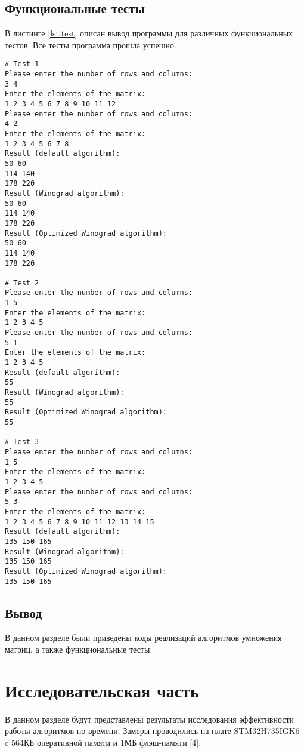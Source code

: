 \documentclass{bmstu}
\begin{document}
\section{Функциональные тесты}
В листинге \ref{lst:test} описан вывод программы для различных функциональных тестов. Все тесты программа прошла успешно.
\begin{center}
\captionsetup{justification=raggedright,singlelinecheck=off}
\begin{lstlisting}[label=lst:test, numbers=none, caption=Функциональные тесты]
# Test 1
Please enter the number of rows and columns:
3 4
Enter the elements of the matrix:
1 2 3 4 5 6 7 8 9 10 11 12
Please enter the number of rows and columns:
4 2
Enter the elements of the matrix:
1 2 3 4 5 6 7 8
Result (default algorithm):
50 60
114 140
178 220
Result (Winograd algorithm):
50 60
114 140
178 220
Result (Optimized Winograd algorithm):
50 60
114 140
178 220

# Test 2
Please enter the number of rows and columns:
1 5
Enter the elements of the matrix:
1 2 3 4 5
Please enter the number of rows and columns:
5 1
Enter the elements of the matrix:
1 2 3 4 5
Result (default algorithm):
55
Result (Winograd algorithm):
55
Result (Optimized Winograd algorithm):
55

# Test 3
Please enter the number of rows and columns:
1 5
Enter the elements of the matrix:
1 2 3 4 5
Please enter the number of rows and columns:
5 3
Enter the elements of the matrix:
1 2 3 4 5 6 7 8 9 10 11 12 13 14 15
Result (default algorithm):
135 150 165
Result (Winograd algorithm):
135 150 165
Result (Optimized Winograd algorithm):
135 150 165
\end{lstlisting}
\end{center}

\section*{Вывод}
В данном разделе были приведены коды реализаций алгоритмов умножения матриц, а также функциональные тесты.


\newpage
\chapter{Исследовательская часть}
В данном разделе будут представлены результаты исследования эффективности работы алгоритмов по времени. Замеры проводились на плате STM32H735IGK6 c 564КБ оперативной памяти и 1МБ флэш-памяти [4].
\end{document}
